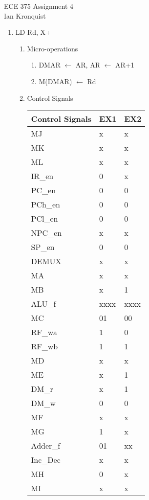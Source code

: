 \documentclass[12pt,letterpaper]{article}
\begin{document}
\begin{flushright}
{\large
ECE 375 Assignment 4\\
Ian Kronquist
}
\end{flushright}

\bigskip

\begin{enumerate}
    \item LD Rd, X+
    \begin{enumerate}
        \item Micro-operations \\
        \begin{enumerate}[i]
            \item DMAR $\leftarrow$ AR, AR $\leftarrow$ AR+1
            \item M(DMAR) $\leftarrow$ Rd
        \end{enumerate}

        \item Control Signals\\
            \begin{tabular}{l l l}
                 Control Signals & EX1 & EX2 \\
                 \hline
                 MJ & x & x \\
                 MK & x & x \\
                 ML & x & x \\
                 IR\_en & 0 & x \\
                 PC\_en & 0 & 0 \\
                 PCh\_en & 0 & 0 \\
                 PCl\_en & 0 & 0 \\
                 NPC\_en & x & x \\
                 SP\_en & 0 & 0 \\
                 DEMUX & x & x \\
                 MA & x & x \\
                 MB & x & 1 \\
                 ALU\_f & xxxx & xxxx \\
                 MC & 01 & 00 \\
                 RF\_wa & 1 & 0 \\
                 RF\_wb & 1 & 1 \\
                 MD & x & x \\
                 ME & x & 1 \\
                 DM\_r & x & 1 \\
                 DM\_w & 0 & 0 \\
                 MF & x & x \\
                 MG & 1 & x \\
                 Adder\_f & 01 & xx \\
                 Inc\_Dec & x & x \\
                 MH & 0 & x \\
                 MI & x & x \\
            \end{tabular}


\end{enumerate}
\end{enumerate}
\end{document}
